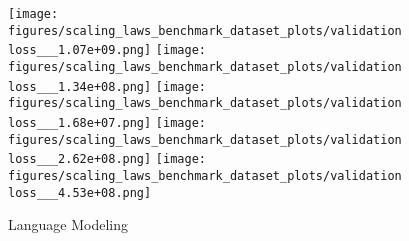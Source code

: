 \begin{figure*}
    \centering


\texttt{[image: figures/scaling\_laws\_benchmark\_dataset\_plots/validation loss\_\_\_1.07e+09.png]}
\texttt{[image: figures/scaling\_laws\_benchmark\_dataset\_plots/validation loss\_\_\_1.34e+08.png]}
\texttt{[image: figures/scaling\_laws\_benchmark\_dataset\_plots/validation loss\_\_\_1.68e+07.png]}
\texttt{[image: figures/scaling\_laws\_benchmark\_dataset\_plots/validation loss\_\_\_2.62e+08.png]}
\texttt{[image: figures/scaling\_laws\_benchmark\_dataset\_plots/validation loss\_\_\_4.53e+08.png]}

    \caption{
    Language Modeling
    }
    \label{fig:scaling_laws_benchmark_dataset__language_modeling}
\end{figure*}

\FloatBarrier